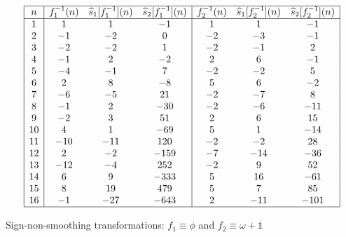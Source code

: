 \documentclass[12pt,reqno,a4letter]{article}
\numberwithin{figure}{section}
\numberwithin{table}{section}
\numberwithin{equation}{section}
\theoremstyle{plain}
\numberwithin{theorem}{section}
\theoremstyle{definition}
\begin{document}
\begin{table}[h!]
\begin{equation*}
\begin{array}{|c|ccc|ccc|} 
 \hline
 n & f_1^{-1}(n) & \widehat{s}_1[f_1^{-1}](n) & \widehat{s}_2[f_1^{-1}](n) & 
     f_2^{-1}(n) & \widehat{s}_1[f_2^{-1}](n) & 
     \widehat{s}_2[f_2^{-1}](n) \\ \hline 
 1 & 1 & 1 & -1 & 1 & 1 & -1 \\
 2 & -1 & -2 & 0 & -2 & -3 & -1 \\
 3 & -2 & -2 & 1 & -2 & -1 & 2 \\
 4 & -1 & 2 & -2 & 2 & 6 & -1 \\
 5 & -4 & -1 & 7 & -2 & -2 & 5 \\
 6 & 2 & 8 & -8 & 5 & 6 & -2 \\
 7 & -6 & -5 & 21 & -2 & -7 & 8 \\
 8 & -1 & 2 & -30 & -2 & -6 & -11 \\
 9 & -2 & 3 & 51 & 2 & 6 & 15 \\
 10 & 4 & 1 & -69 & 5 & 1 & -14 \\
 11 & -10 & -11 & 120 & -2 & -2 & 28 \\
 12 & 2 & -2 & -159 & -7 & -14 & -36 \\
 13 & -12 & -4 & 252 & -2 & 9 & 52 \\
 14 & 6 & 9 & -333 & 5 & 16 & -61 \\
 15 & 8 & 19 & 479 & 5 & 7 & 85 \\
 16 & -1 & -27 & -643 & 2 & -11 & -101 \\
 \hline
\end{array}
\end{equation*}
\caption{Sign-non-smoothing transformations: $f_1 \equiv \phi$ and $f_2 \equiv \omega + \mathds{1}$}
\label{table_s12Hatfn_SignSmoothingTF_v1}
\end{table}
\end{document}
